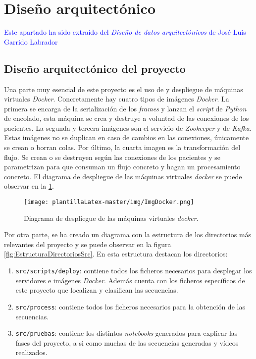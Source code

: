 \newpage
\section{Diseño arquitectónico}
\textcolor{blue}{Este apartado ha sido extraído del \textit{Diseño de datos arquitectónicos} de José Luis Garrido Labrador}

\subsection{Diseño arquitectónico del proyecto}
Una parte muy esencial de este proyecto es el uso de y despliegue de máquinas virtuales \textit{Docker}. Concretamente hay cuatro tipos de imágenes \textit{Docker}. La primera se
encarga de la serialización de los \textit{frames} y lanzan el \textit{script} de \textit{Python} de
encolado, esta máquina se crea y destruye a voluntad de las conexiones de los pacientes. La segunda y tercera imágenes son el servicio de \textit{Zookeeper} y de \textit{Kafka}. Estas imágenes no se duplican en caso de cambios en las conexiones, únicamente se crean o borran colas. Por último, la cuarta imagen es la transformación del flujo. Se crean o se destruyen según las conexiones de los pacientes y se parametrizan para que consuman un flujo concreto y hagan un procesamiento concreto. El diagrama de despliegue de las máquinas virtuales \textit{docker} se puede observar en la \ref{fig:imgDock}.

\begin{figure}[H]
    \centering
    \texttt{[image: plantillaLatex-master/img/ImgDocker.png]}
    \caption{Diagrama de despliegue de las máquinas virtuales \textit{docker}.}
    \label{fig:imgDock}
\end{figure}

Por otra parte, se ha creado un diagrama con la estructura de los directorios más relevantes del proyecto y se puede observar en la figura \ref{fig:EstructuraDirectoriosSrc}. En esta estructura destacan los directorios:
\begin{enumerate}
    \item \texttt{src/scripts/deploy}: contiene todos los ficheros necesarios para desplegar los servidores e imágenes \textit{Docker}. Además cuenta con los ficheros específicos de este proyecto que localizan y clasifican las secuencias.
    \item \texttt{src/process}: contiene todos los ficheros necesarios para la obtención de las secuencias.
    \item \texttt{src/pruebas}: contiene los distintos \textit{notebooks} generados para explicar las fases del proyecto, a si como muchas de las secuencias generadas y vídeos realizados.
\end{enumerate}

